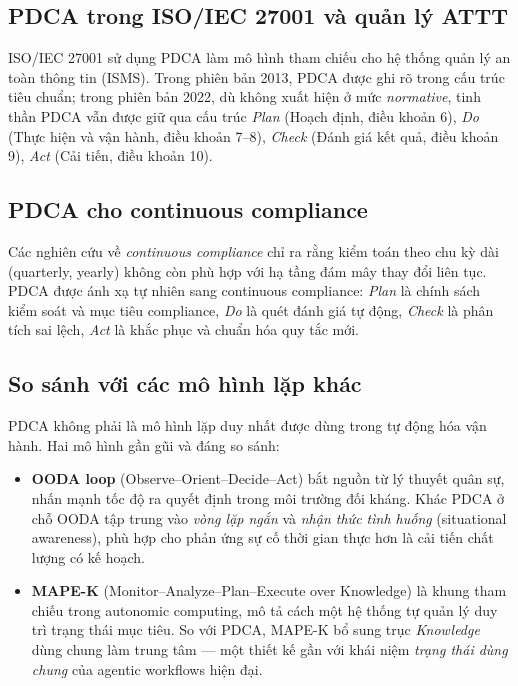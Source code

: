 \subsection{PDCA trong ISO/IEC 27001 và quản lý ATTT}
\label{subsec:pdca-iso27001}

ISO/IEC 27001 \cite{iso_27001_2022} sử dụng PDCA làm mô hình tham chiếu cho hệ thống quản lý an toàn thông tin (ISMS). Trong phiên bản 2013, PDCA được ghi rõ trong cấu trúc tiêu chuẩn; trong phiên bản 2022, dù không xuất hiện ở mức \textit{normative}, tinh thần PDCA vẫn được giữ qua cấu trúc \textit{Plan} (Hoạch định, điều khoản 6), \textit{Do} (Thực hiện và vận hành, điều khoản 7--8), \textit{Check} (Đánh giá kết quả, điều khoản 9), \textit{Act} (Cải tiến, điều khoản 10).

\subsection{PDCA cho continuous compliance}
\label{subsec:pdca-cc}

Các nghiên cứu về \textit{continuous compliance} \cite{continuous_compliance_2022} chỉ ra rằng kiểm toán theo chu kỳ dài (quarterly, yearly) không còn phù hợp với hạ tầng đám mây thay đổi liên tục. PDCA được ánh xạ tự nhiên sang continuous compliance: \textit{Plan} là chính sách kiểm soát và mục tiêu compliance, \textit{Do} là quét đánh giá tự động, \textit{Check} là phân tích sai lệch, \textit{Act} là khắc phục và chuẩn hóa quy tắc mới.

\subsection{So sánh với các mô hình lặp khác}
\label{subsec:pdca-vs-others}

PDCA không phải là mô hình lặp duy nhất được dùng trong tự động hóa vận hành. Hai mô hình gần gũi và đáng so sánh:

\begin{itemize}
  \item \textbf{OODA loop} (Observe--Orient--Decide--Act) \cite{boyd_ooda_1996} bắt nguồn từ lý thuyết quân sự, nhấn mạnh tốc độ ra quyết định trong môi trường đối kháng. Khác PDCA ở chỗ OODA tập trung vào \textit{vòng lặp ngắn} và \textit{nhận thức tình huống} (situational awareness), phù hợp cho phản ứng sự cố thời gian thực hơn là cải tiến chất lượng có kế hoạch.
  \item \textbf{MAPE-K} (Monitor--Analyze--Plan--Execute over Knowledge) \cite{ibm_mapek_2003} là khung tham chiếu trong autonomic computing, mô tả cách một hệ thống tự quản lý duy trì trạng thái mục tiêu. So với PDCA, MAPE-K bổ sung trục \textit{Knowledge} dùng chung làm trung tâm --- một thiết kế gần với khái niệm \textit{trạng thái dùng chung} của agentic workflows hiện đại.
\end{itemize}

